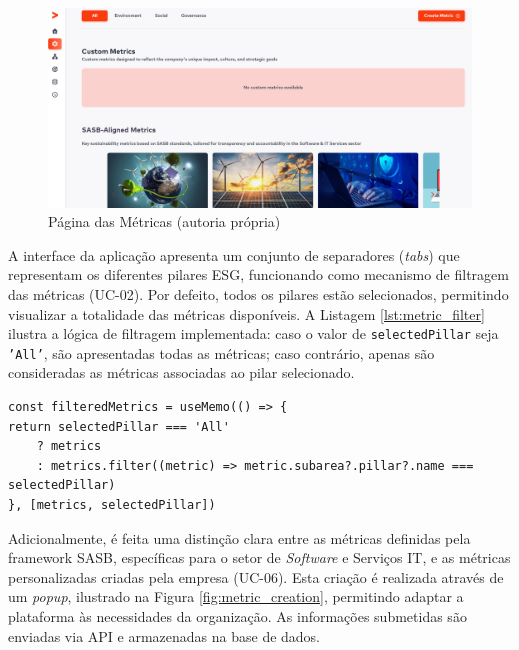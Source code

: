\begin{figure}[H]
    \centering
    \includegraphics[width=\linewidth,keepaspectratio]{frontmatter/assets/platform_prints/metrics/metrics_done.png}
    \caption{Página das Métricas (autoria própria)}
    \label{fig:metric_done}
\end{figure}

A interface da aplicação apresenta um conjunto de separadores (\textit{tabs}) que representam os diferentes pilares ESG, funcionando como mecanismo de filtragem das métricas (UC-02). Por defeito, todos os pilares estão selecionados, permitindo visualizar a totalidade das métricas disponíveis. A Listagem \ref{lst:metric_filter} ilustra a lógica de filtragem implementada: caso o valor de \texttt{selectedPillar} seja \texttt{'All'}, são apresentadas todas as métricas; caso contrário, apenas são consideradas as métricas associadas ao pilar selecionado.

\begin{lstlisting}[style=customts, caption={Excerto de Código com Filtragem das Métricas}, label={lst:metric_filter}]
const filteredMetrics = useMemo(() => {
return selectedPillar === 'All'
    ? metrics
    : metrics.filter((metric) => metric.subarea?.pillar?.name === selectedPillar)
}, [metrics, selectedPillar])
\end{lstlisting}

Adicionalmente, é feita uma distinção clara entre as métricas definidas pela framework \gls{SASB}, específicas para o setor de \textit{Software} e Serviços IT, e as métricas personalizadas criadas pela empresa (UC-06). Esta criação é realizada através de um \textit{popup}, ilustrado na Figura \ref{fig:metric_creation}, permitindo adaptar a plataforma às necessidades da organização. As informações submetidas são enviadas via API e armazenadas na base de dados.

